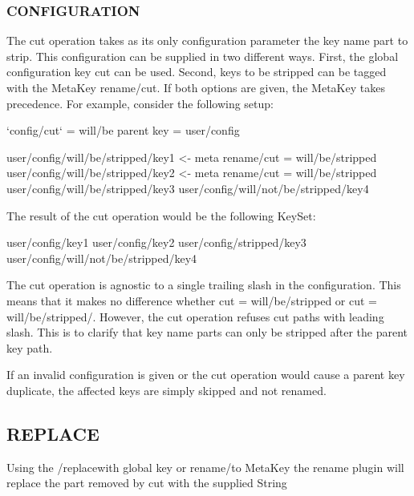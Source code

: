 \subsubsection*{C\+O\+N\+F\+I\+G\+U\+R\+A\+T\+I\+O\+N}

The cut operation takes as its only configuration parameter the key name part to strip. This configuration can be supplied in two different ways. First, the global configuration key {\ttfamily cut} can be used. Second, keys to be stripped can be tagged with the Meta\+Key {\ttfamily rename/cut}. If both options are given, the Meta\+Key takes precedence. For example, consider the following setup\+: \begin{DoxyVerb}                            `config/cut` = will/be
                            parent key = user/config

                            user/config/will/be/stripped/key1                       <- meta rename/cut = will/be/stripped
                            user/config/will/be/stripped/key2                       <- meta rename/cut = will/be/stripped
                            user/config/will/be/stripped/key3
                            user/config/will/not/be/stripped/key4
\end{DoxyVerb}


The result of the cut operation would be the following Key\+Set\+: \begin{DoxyVerb}                            user/config/key1
                            user/config/key2
                            user/config/stripped/key3
                            user/config/will/not/be/stripped/key4
\end{DoxyVerb}


The cut operation is agnostic to a single trailing slash in the configuration. This means that it makes no difference whether {\ttfamily cut = will/be/stripped} or {\ttfamily cut = will/be/stripped/}. However, the cut operation refuses cut paths with leading slash. This is to clarify that key name parts can only be stripped after the parent key path.

If an invalid configuration is given or the cut operation would cause a parent key duplicate, the affected keys are simply skipped and not renamed.

\subsection*{R\+E\+P\+L\+A\+C\+E}

Using the {\ttfamily /replacewith} global key or {\ttfamily rename/to} Meta\+Key the rename plugin will replace the part removed by {\ttfamily cut} with the supplied String

